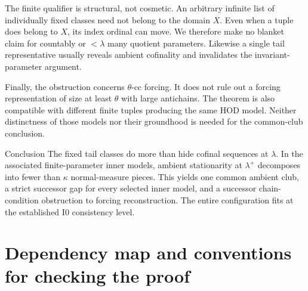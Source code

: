 \documentclass[11pt,letterpaper]{article}
\theoremstyle{definition}
\numberwithin{equation}{section}
\newcommand{\HOD}{\mathrm{HOD}}
\newcommand{\Izero}{\mathrm{I0}}
\begin{document}
The finite qualifier is structural, not cosmetic. An arbitrary infinite list of individually fixed classes need not belong to the domain $X$. Even when a tuple does belong to $X$, its index ordinal can move. We therefore make no blanket claim for countably or $<\lambda$ many quotient parameters. Likewise a single tail representative usually reveals ambient cofinality and invalidates the invariant-parameter argument.

Finally, the obstruction concerns $\theta$-cc forcing. It does not rule out a forcing representation of size at least $\theta$ with large antichains. The theorem is also compatible with different finite tuples producing the same $\HOD$ model. Neither distinctness of those models nor their groundhood is needed for the common-club conclusion.

\begin{assessment}{Conclusion}
The fixed tail classes do more than hide cofinal sequences at $\lambda$. In the associated finite-parameter inner models, ambient stationarity at $\lambda^+$ decomposes into fewer than $\kappa$ normal-measure pieces. This yields one common ambient club, a strict successor gap for every selected inner model, and a successor chain-condition obstruction to forcing reconstruction. The entire configuration fits at the established $\Izero$ consistency level.
\end{assessment}

\appendix
\section{Dependency map and conventions for checking the proof}\label{app:dependencies}
\end{document}
